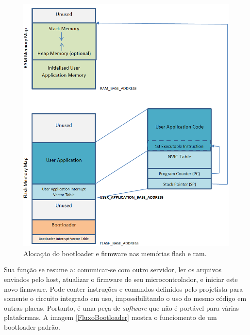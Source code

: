 \begin{figure}[H]
    \scriptsize
     \centering
     \includegraphics[scale=0.7]{dados/figuras/DiagBootloaderOriginal.png}
     \caption{Alocação do bootloader e firmware nas memórias flash e ram.}
     \label{Diag_Bootloader}
\end{figure}

Sua função se resume a: comunicar-se com outro servidor, ler os arquivos enviados pelo host, atualizar o firmware de seu microcontrolador, e iniciar este novo firmware. 
Pode conter instruções e comandos definidos pelo projetista para somente o circuito integrado em uso, impossibilitando o uso do mesmo código em outras placas.
Portanto, é uma peça de \textit{software} que não é portável para várias plataformas. A imagem \ref{FluxoBootloader} mostra o funciomento de um bootloader padrão. 

